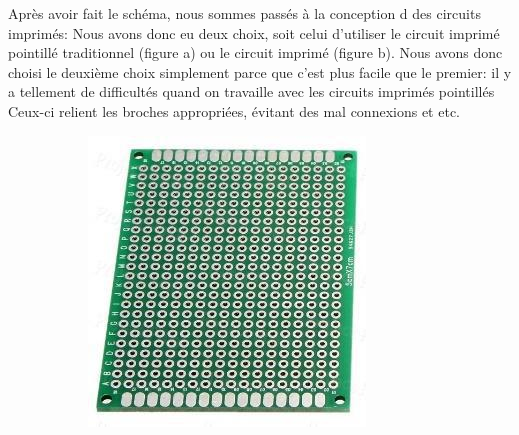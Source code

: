 \FloatBarrier

Après avoir fait le schéma, nous sommes passés à la conception d des circuits imprimés: Nous avons donc eu deux choix, soit celui d’utiliser le circuit imprimé pointillé traditionnel (figure a) ou le circuit imprimé (figure b). Nous avons donc choisi le deuxième choix simplement parce que c’est plus facile que le premier: il y a tellement de difficultés quand on travaille avec les circuits imprimés pointillés Ceux-ci relient les broches appropriées, évitant des  mal connexions et etc.

\begin{figure}[!htbp]
    \centering
    \begin{subfigure}[t]{.45\linewidth}
        \centering
         \includegraphics[width=\textwidth]{assets/conception1/img31.jpg}
        \caption{}
    \end{subfigure}
    \hfill
    \begin{subfigure}[t]{.45\linewidth}
        \centering

\end{subfigure}
\end{figure}

